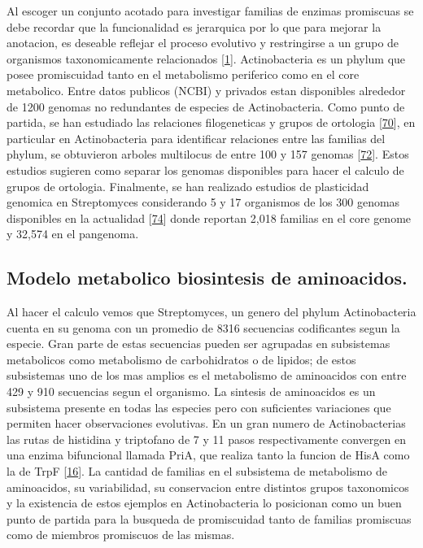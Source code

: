 \documentclass[12pt,twoside]{reedthesis}
\begin{document}
  Al escoger un conjunto acotado para investigar familias de enzimas
  promiscuas se debe recordar que la funcionalidad es jerarquica por lo
  que para mejorar la anotacion, es deseable reflejar el proceso evolutivo
  y restringirse a un grupo de organismos taxonomicamente relacionados
  {[}\protect\hyperlink{ref-cruz-morales_phylogenomic_2016}{1}{]}.
  Actinobacteria es un phylum que posee promiscuidad tanto en el
  metabolismo periferico como en el core metabolico. Entre datos publicos
  (NCBI) y privados estan disponibles alrededor de 1200 genomas no
  redundantes de especies de Actinobacteria. Como punto de partida, se han
  estudiado las relaciones filogeneticas y grupos de ortologia
  {[}\protect\hyperlink{ref-li_orthomcl_2003}{70}{]}, en particular en
  Actinobacteria para identificar relaciones entre las familias del
  phylum, se obtuvieron arboles multilocus de entre 100 y 157 genomas
  {[}\protect\hyperlink{ref-gao_phylogenetic_2012}{72}{]}. Estos estudios
  sugieren como separar los genomas disponibles para hacer el calculo de
  grupos de ortologia. Finalmente, se han realizado estudios de
  plasticidad genomica en Streptomyces considerando 5 y 17 organismos de
  los 300 genomas disponibles en la actualidad
  {[}\protect\hyperlink{ref-zhou_genome_2012}{74}{]} donde reportan 2,018
  familias en el core genome y 32,574 en el pangenoma.
  
  \subsection{Modelo metabolico biosintesis de
  aminoacidos.}\label{modelo-metabolico-biosintesis-de-aminoacidos.}
  
  Al hacer el calculo vemos que Streptomyces, un genero del phylum
  Actinobacteria cuenta en su genoma con un promedio de 8316 secuencias
  codificantes segun la especie. Gran parte de estas secuencias pueden ser
  agrupadas en subsistemas metabolicos como metabolismo de carbohidratos o
  de lipidos; de estos subsistemas uno de los mas amplios es el
  metabolismo de aminoacidos con entre 429 y 910 secuencias segun el
  organismo. La sintesis de aminoacidos es un subsistema presente en todas
  las especies pero con suficientes variaciones que permiten hacer
  observaciones evolutivas. En un gran numero de Actinobacterias las rutas
  de histidina y triptofano de 7 y 11 pasos respectivamente convergen en
  una enzima bifuncional llamada PriA, que realiza tanto la funcion de
  HisA como la de TrpF
  {[}\protect\hyperlink{ref-baronagomez_occurrence_2003}{16}{]}. La
  cantidad de familias en el subsistema de metabolismo de aminoacidos, su
  variabilidad, su conservacion entre distintos grupos taxonomicos y la
  existencia de estos ejemplos en Actinobacteria lo posicionan como un
  buen punto de partida para la busqueda de promiscuidad tanto de familias
  promiscuas como de miembros promiscuos de las mismas.
  
\end{document}
